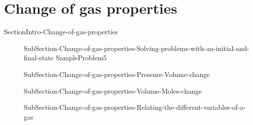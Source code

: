 \documentclass[main.tex]{subfiles}
\newcommand\chapterlabel{ChMIX-biomoleculesinsolution}\setcounter{figurenewcounter}{0}\setcounter{tablenewcounter}{0}\setcounter{formulanewcounter}{0}
\begin{document}
 \section{\faEnvira Change of gas properties}{SectionIntro-Change-of-gas-properties}
\sloppy \begin{description}
\item[]  {SubSection-Change-of-gas-properties-Solving-problems-with-an-initial-and-final-state}
{SampleProblem5}
\item[] {SubSection-Change-of-gas-properties-Pressure-Volume-change}
 \item[] {SubSection-Change-of-gas-properties-Volume-Moles-change}
\item[]  {SubSection-Change-of-gas-properties-Relating-the-different-variables-of-a-gas}
\end{description}



 



 
\end{document}

